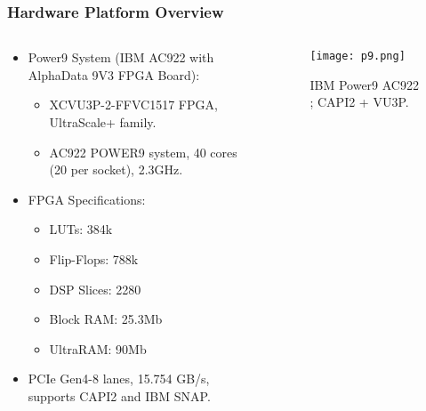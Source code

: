 \begin{frame}
    \frametitle{Hardware Platform Overview}

    \begin{columns}
        \begin{column}{0.5\textwidth}
            \begin{itemize}
                \item Power9 System (IBM AC922 with AlphaData 9V3 FPGA Board):
                \begin{itemize}
                    \item XCVU3P-2-FFVC1517 FPGA, UltraScale+ family.
                    \item AC922 POWER9 system, 40 cores (20 per socket), 2.3GHz.
                \end{itemize}
                \item FPGA Specifications:
                \begin{itemize}
                    \item LUTs: 384k
                    \item Flip-Flops: 788k
                    \item DSP Slices: 2280
                    \item Block RAM: 25.3Mb
                    \item UltraRAM: 90Mb
                \end{itemize}
                \item PCIe Gen4-8 lanes, 15.754 GB/s, supports CAPI2 and IBM SNAP.
            \end{itemize}
        \end{column}

        \begin{column}{0.5\textwidth}
	    \begin{figure}[H]
            \centering
            \texttt{[image: p9.png]}
            \caption{IBM Power9 AC922 ; CAPI2 + VU3P.}
	    \end{figure}
        \end{column}
    \end{columns}

\end{frame}

